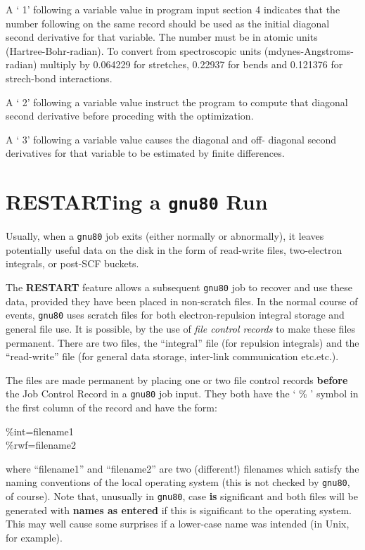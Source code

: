 A ` 1' following a variable value in program input section 4
indicates that the number following on the same record should be used as
the initial diagonal second derivative for that variable. The number
must be in atomic units (Hartree-Bohr-radian).  To convert from
spectroscopic units (mdynes-Angstroms-radian) multiply by 0.064229 for
stretches, 0.22937 for bends and 0.121376 for strech-bond interactions.

A ` 2' following a variable value instruct the program to compute
that diagonal second derivative before proceding with the optimization.

A ` 3' following a variable value causes the diagonal and off-
diagonal second derivatives for that variable to be estimated by finite
differences.
\section{\sf RESTARTing a {\tt gnu80} Run}
\label{restart}
Usually, when a {\tt gnu80} job exits (either normally or abnormally), it
leaves potentially useful data on the disk in the form of read-write
files, two-electron integrals,  or post-SCF buckets. 

The {\bf RESTART}
feature allows a subsequent {\tt gnu80} job to recover and use these data,
provided they have been placed in non-scratch files. In the normal course
of events, {\tt gnu80} uses scratch files for both electron-repulsion
integral storage and general file use. It is possible, by the
use of {\em file control records} to make these files permanent.
There are two files, the ``integral'' file (for repulsion
integrals) and the ``read-write'' file (for general data
storage, inter-link communication etc.etc.).

The files are made permanent by placing one or two file control records
{\bf before} the Job Control Record in a {\tt gnu80} job input.
They both have the ` \% ' symbol in the first column of the record
and have the form:
\begin{description}
\item[\%int=filename1] 
\item[\%rwf=filename2] 
\end{description}
where ``filename1'' and ``filename2''
are two (different!) filenames which satisfy the naming conventions of
the local operating system (this is not checked by {\tt gnu80}, of course).
Note that,  unusually in {\tt gnu80}, case {\bf is}  significant and both files
will be generated with  {\bf names as entered} if this is significant
to the operating system. This may well cause
some surprises if a lower-case name was intended (in Unix, for example).

